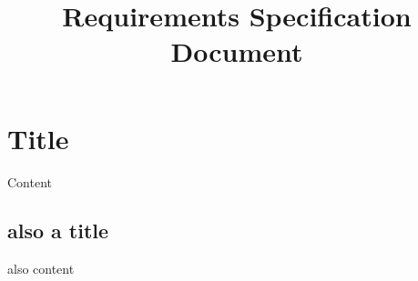 \documentclass{article}
\title{Requirements Specification Document}
\begin{document}
\maketitle
\newpage

\section{Title}
	Content
	\subsection{also a title}
		also content
\end{document}
